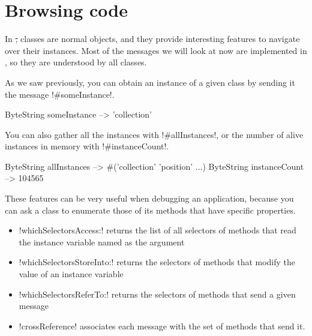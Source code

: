 \documentclass[a4paper,10pt,twoside]{book}
\begin{document}

\section{Browsing code} %

In \st, classes are normal objects, and they provide interesting features to navigate over their instances.
Most of the messages we will look at now are implemented in , so they are understood by all classes.

As we saw previously, you can obtain an instance of a given class by sending it the message \ct!#someInstance!.

\begin{code}{} %
ByteString someInstance --> 'collection'
\end{code}

You can also gather all the instances with \ct!#allInstances!, or the number of alive instances in memory with \ct!#instanceCount!.

\begin{code}{} %
ByteString allInstances     --> #('collection' 'position'  ...)
ByteString instanceCount --> 104565
\end{code}

These features can be very useful when debugging an application, because you can ask a class to enumerate those of its methods that have specific properties.
\begin{itemize}
\item \ct!whichSelectorsAccess:! returns the list of all selectors of methods that read the instance variable named as the argument
\item \ct!whichSelectorsStoreInto:! returns the selectors of methods that modify the value of an instance variable
\item \ct!whichSelectorsReferTo:! returns the selectors of methods that send a given message
\item \ct!crossReference! associates each message with the set of methods that send it.
\end{itemize}

\end{document}
